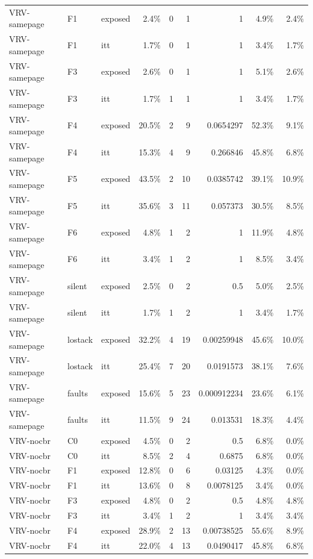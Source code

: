 \begin{tabular}{lllrrrrrr}
VRV-samepage & F1 & exposed & 2.4\% & 0 & 1 & 1 & 4.9\% & 2.4\% \\
VRV-samepage & F1 & itt & 1.7\% & 0 & 1 & 1 & 3.4\% & 1.7\% \\
VRV-samepage & F3 & exposed & 2.6\% & 0 & 1 & 1 & 5.1\% & 2.6\% \\
VRV-samepage & F3 & itt & 1.7\% & 1 & 1 & 1 & 3.4\% & 1.7\% \\
VRV-samepage & F4 & exposed & 20.5\% & 2 & 9 & 0.0654297 & 52.3\% & 9.1\% \\
VRV-samepage & F4 & itt & 15.3\% & 4 & 9 & 0.266846 & 45.8\% & 6.8\% \\
VRV-samepage & F5 & exposed & 43.5\% & 2 & 10 & 0.0385742 & 39.1\% & 10.9\% \\
VRV-samepage & F5 & itt & 35.6\% & 3 & 11 & 0.057373 & 30.5\% & 8.5\% \\
VRV-samepage & F6 & exposed & 4.8\% & 1 & 2 & 1 & 11.9\% & 4.8\% \\
VRV-samepage & F6 & itt & 3.4\% & 1 & 2 & 1 & 8.5\% & 3.4\% \\
VRV-samepage & silent & exposed & 2.5\% & 0 & 2 & 0.5 & 5.0\% & 2.5\% \\
VRV-samepage & silent & itt & 1.7\% & 1 & 2 & 1 & 3.4\% & 1.7\% \\
VRV-samepage & lostack & exposed & 32.2\% & 4 & 19 & 0.00259948 & 45.6\% & 10.0\% \\
VRV-samepage & lostack & itt & 25.4\% & 7 & 20 & 0.0191573 & 38.1\% & 7.6\% \\
VRV-samepage & faults & exposed & 15.6\% & 5 & 23 & 0.000912234 & 23.6\% & 6.1\% \\
VRV-samepage & faults & itt & 11.5\% & 9 & 24 & 0.013531 & 18.3\% & 4.4\% \\
VRV-nocbr & C0 & exposed & 4.5\% & 0 & 2 & 0.5 & 6.8\% & 0.0\% \\
VRV-nocbr & C0 & itt & 8.5\% & 2 & 4 & 0.6875 & 6.8\% & 0.0\% \\
VRV-nocbr & F1 & exposed & 12.8\% & 0 & 6 & 0.03125 & 4.3\% & 0.0\% \\
VRV-nocbr & F1 & itt & 13.6\% & 0 & 8 & 0.0078125 & 3.4\% & 0.0\% \\
VRV-nocbr & F3 & exposed & 4.8\% & 0 & 2 & 0.5 & 4.8\% & 4.8\% \\
VRV-nocbr & F3 & itt & 3.4\% & 1 & 2 & 1 & 3.4\% & 3.4\% \\
VRV-nocbr & F4 & exposed & 28.9\% & 2 & 13 & 0.00738525 & 55.6\% & 8.9\% \\
VRV-nocbr & F4 & itt & 22.0\% & 4 & 13 & 0.0490417 & 45.8\% & 6.8\% \\

\end{tabular}
